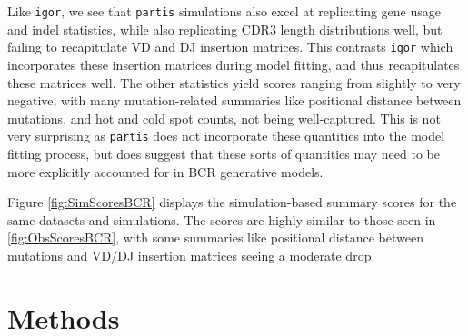 \documentclass{article}
\begin{document}
Like \texttt{igor}, we see that \texttt{partis} simulations also excel at replicating gene usage and indel statistics, while also replicating CDR3 length distributions well, but failing to recapitulate VD and DJ insertion matrices.
This contrasts \texttt{igor} which incorporates these insertion matrices during model fitting, and thus recapitulates these matrices well.
The other statistics yield scores ranging from slightly to very negative, with many mutation-related summaries like positional distance between mutations, and hot and cold spot counts, not being well-captured.
This is not very surprising as \texttt{partis} does not incorporate these quantities into the model fitting process, but does suggest that these sorts of quantities may need to be more explicitly accounted for in BCR generative models.


Figure \ref{fig:SimScoresBCR} displays the simulation-based summary scores for the same datasets and simulations.
The scores are highly similar to those seen in \ref{fig:ObsScoresBCR}, with some summaries like positional distance between mutations and VD/DJ insertion matrices seeing a moderate drop.

\section*{Methods}
\end{document}
